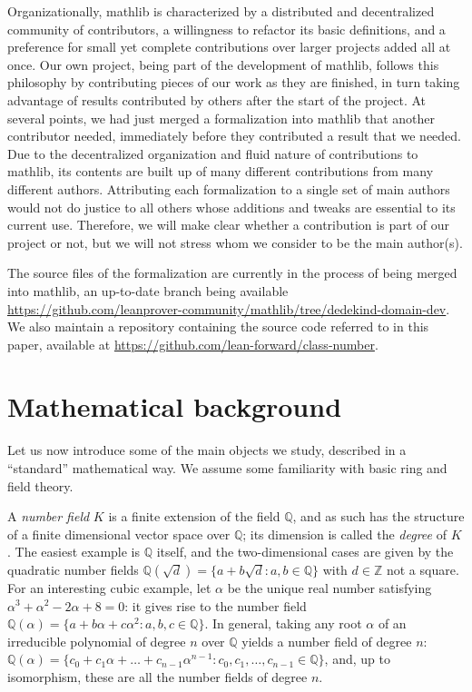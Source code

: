\documentclass[a4paper,USenglish,cleveref, autoref, thm-restate]{lipics-v2021}
\newcommand{\mathlib}{\textsf{mathlib}\xspace}
\newcommand{\Q}{\mathbb{Q}}
\newcommand{\Z}{\mathbb{Z}}
\begin{document}
Organizationally, \mathlib is characterized by a distributed and decentralized community of contributors, a willingness to refactor its basic definitions, and a preference for small yet complete contributions over larger projects added all at once.
Our own project, being part of the development of \mathlib, follows this philosophy by contributing pieces of our work as they are finished,
in turn taking advantage of results contributed by others after the start of the project.
At several points, we had just merged a formalization into \mathlib that another contributor needed,
immediately before they contributed a result that we needed.
Due to the decentralized organization and fluid nature of contributions to \mathlib, its contents are built up of many different contributions from many different authors. Attributing each formalization to a single set of main authors would not do justice to all others whose additions and tweaks are essential to its current use. Therefore, we will make clear whether a contribution is part of our project or not, but we will not stress whom we consider to be the main author(s).

The source files of the formalization are currently in the process of being merged into \mathlib, an up-to-date branch being available \url{https://github.com/leanprover-community/mathlib/tree/dedekind-domain-dev}. We also maintain a %
repository containing the source code referred to in this paper, available at \url{https://github.com/lean-forward/class-number}.

\section{Mathematical background}\label{sec math background}

Let us now introduce some of the main objects we study, described in a ``standard'' mathematical way. We assume some familiarity with basic ring and field theory.%

A \emph{number field} $K$ is a finite extension of the field $\Q$, and as such has the structure of a finite dimensional vector space over $\Q$; its dimension is called the \emph{degree} of $K$.
The easiest example is $\Q$ itself, and the two-dimensional cases are given by the quadratic number fields
$\Q(\sqrt{d})=\{a+b\sqrt{d} : a,b \in \Q\}$
with $d \in \Z$ not a square. 
For an interesting cubic example, let $\alpha$ be the unique real number satisfying $\alpha^3 + \alpha^2 - 2\alpha + 8=0$: it gives rise to the number field
$\Q(\alpha)=\{a+b\alpha+c \alpha^2: a,b,c \in \Q\}$.
In general, taking any root $\alpha$ of an irreducible polynomial of degree $n$ over $\Q$ yields a number field of degree $n$:
$\Q(\alpha)=\{c_0+c_1\alpha+\ldots+c_{n-1} \alpha^{n-1} : c_0,c_1,\ldots,c_{n-1} \in \Q \}$,
and, up to isomorphism, these are all the number fields of degree $n$.
\end{document}
